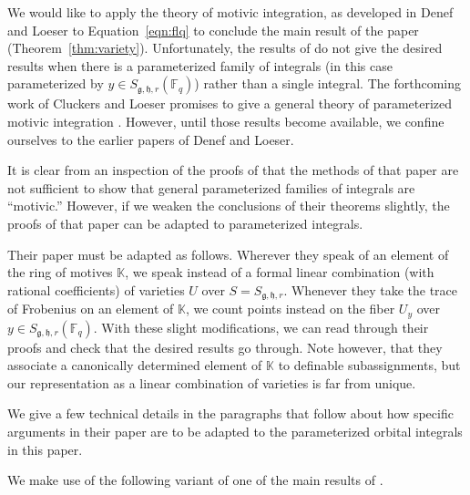 \documentclass[11pt]{amsart}
\theoremstyle{definition}
\theoremstyle{remark}
\numberwithin{equation}{theorem}
\def\f{{\mathbb{F}_q}}
\newcommand{\ring}[1]{\mathbb{#1}}
\def\lie#1{{\mathfrak{#1}}}
\begin{document}
We would like to apply the theory of motivic integration, as
developed in Denef and Loeser \cite{DLD} to Equation~\ref{eqn:flq}
to conclude the main result of the paper
(Theorem~\ref{thm:variety}). Unfortunately, the results of
\cite{DLD} do not give the desired results when there is a
parameterized family of integrals (in this case parameterized by
$y\in S_{\lie{g},\lie{h},r}(\f)$) rather than a single integral. The
forthcoming work of Cluckers and Loeser promises to give a general
theory of parameterized motivic integration \cite{CL}. However,
until those results become available, we confine ourselves to the
earlier papers of Denef and Loeser.

It is clear from an inspection of the proofs of \cite{DLD} that
the methods of that paper are not sufficient to show that general
parameterized families of integrals are ``motivic.''  However, if
we weaken the conclusions of their theorems slightly, the proofs
of that paper can be adapted to parameterized integrals.

Their paper must be adapted as follows.  Wherever they speak of an
element of the ring of motives $\ring{K}$, we speak instead of a
formal linear combination (with rational coefficients) of
varieties $U$ over $S = S_{\lie{g},\lie{h},r}$. Whenever they take
the trace of Frobenius on an element of $\ring{K}$, we count
points instead on the fiber $U_y$ over $y\in
S_{\lie{g},\lie{h},r}(\f)$.  With these slight modifications, we
can read through their proofs and check that the desired results
go through.  Note however, that they associate a canonically
determined element of $\ring{K}$ to definable subassignments, but
our representation as a linear combination of varieties is far
from unique.

We give a few technical details in the paragraphs that follow
about how specific arguments in their paper are to be adapted to
the parameterized orbital integrals in this paper.

We make use of the following variant of one of the main results of
\cite{DLD}.
\end{document}
